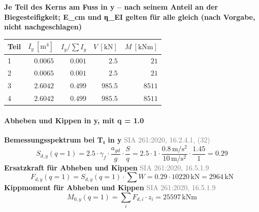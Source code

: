 \documentclass[11pt,a4paper]{article}
\newcommand{\normref}[1]{{\small\textcolor{gray}{#1}}}
\begin{document}
\noindent\textbf{Je Teil des Kerns am Fuss in y – nach seinem Anteil an der Biegesteifigkeit; E\_cm und η\_EI gelten für alle gleich (nach Vorgabe, nicht nachgeschlagen)}
\begin{longtable}{lrrrr}
\hline
Teil & $I_y\ [\mathrm{m}^4]$ & $I_y / \sum I_y$ & $V\ [\mathrm{kN}]$ & $M\ [\mathrm{kNm}]$ \\
\hline
\endhead
1 & $0.0065$ & $0.001$ & $2.5$ & $21$ \\
2 & $0.0065$ & $0.001$ & $2.5$ & $21$ \\
3 & $2.6042$ & $0.499$ & $985.5$ & $8511$ \\
4 & $2.6042$ & $0.499$ & $985.5$ & $8511$ \\
\hline
\end{longtable}
\paragraph{Abheben und Kippen in y, mit q = 1.0}
\noindent\textbf{Bemessungsspektrum bei T₁ in y} \hfill \normref{SIA 261:2020, 16.2.4.1, (32)}
\begin{equation*}
S_{d,y}(q = 1) = 2.5 \cdot \gamma_f \cdot \frac{a_{gd}}{g} \cdot \frac{S}{q} = 2.5 \cdot 1 \cdot \frac{0.8\,\mathrm{m}/\mathrm{s}^{2}}{10\,\mathrm{m}/\mathrm{s}^{2}} \cdot \frac{1.45}{1} = 0.29
\end{equation*}
\noindent\textbf{Ersatzkraft für Abheben und Kippen} \hfill \normref{SIA 261:2020, 16.5.1.9}
\begin{equation*}
F_{d,y}(q = 1) = S_{d,y}(q = 1) \cdot \sum W = 0.29 \cdot 10220\,\mathrm{kN} = 2964\,\mathrm{kN}
\end{equation*}
\noindent\textbf{Kippmoment für Abheben und Kippen} \hfill \normref{SIA 261:2020, 16.5.1.9}
\begin{equation*}
M_{0,y}(q = 1) = \sum_i F_{d,i} \cdot z_i = 25597\,\mathrm{kNm}
\end{equation*}
\end{document}

